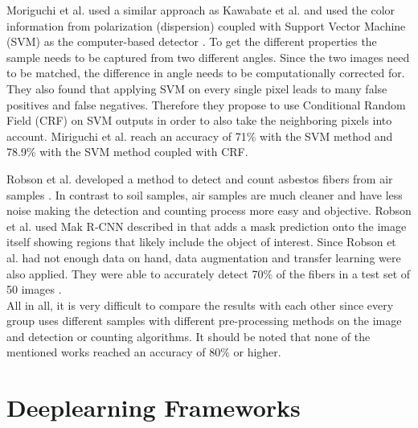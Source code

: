 Moriguchi et al. used a similar approach as Kawabate et al. and used the color information from polarization (dispersion) coupled with Support Vector Machine (SVM) as the computer-based detector \cite{moriguchi2008asbestos}. To get the different properties the sample needs to be captured from two different angles. Since the two images need to be matched, the difference in angle needs to be computationally corrected for. They also found that applying SVM on every single pixel leads to many false positives and false negatives. Therefore they propose to use Conditional Random Field (CRF) on SVM outputs in order to also take the neighboring pixels into account. Miriguchi et al. reach an accuracy of 71\% with the SVM method and 78.9\% with the SVM method coupled with CRF.

Robson et al. developed a method to detect and count asbestos fibers from air samples \cite{robson2018fiac}. In contrast to soil samples, air samples are much cleaner and have less noise making the detection and counting process more easy and objective. Robson et al. used Mak R-CNN described in \cite{he2017mask} that adds a mask prediction onto the image itself showing regions that likely include the object of interest. Since Robson et al. had not enough data on hand, data augmentation and transfer learning were also applied. They were able to accurately detect 70\% of the fibers in a test set of 50 images  \cite{robson2018fiac}. \\


All in all, it is very difficult to compare the results with each other since every group uses different samples with different pre-processing methods on the image and detection or counting algorithms. It should be noted that none of the mentioned works reached an accuracy of 80\% or higher.


\section{Deeplearning Frameworks}

